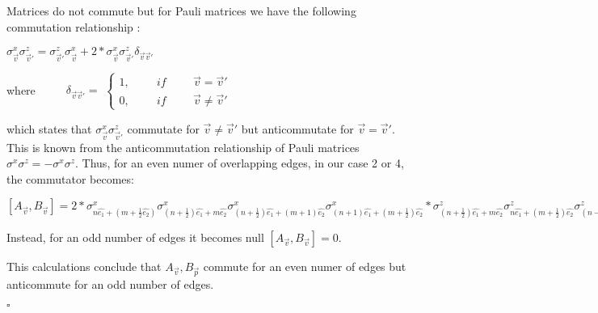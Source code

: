 \documentclass[12pt]{report}
\begin{document}
\begin{minipage}{1\textwidth}
		
		Matrices do not commute but for Pauli matrices we have the following commutation relationship :\newline
		
		
		\begin{center}
			$\sigma^x_{\vec{v}}\sigma^z_{\vec{v}'} = \sigma^z_{\vec{v}'} \sigma^x_{\vec{v}} + 2* \sigma^x_{\vec{v}}\sigma^z_{\vec{v}'} \delta_{\vec{v} \vec{v}'}$\newline
		\end{center}
		
		
		where $\hspace{1cm} \delta_{\vec{v} \vec{v}'} =$
		$\begin{cases}
			1, \hspace{1cm} if \hspace{1cm}  \vec{v} = \vec{v}'\\
			0, \hspace{1cm} if \hspace{1cm} \vec{v} \neq \vec{v}'
		\end{cases}$\newline
		
		which states that 	$\sigma^x_{\vec{v}}\sigma^z_{\vec{v}'}$ commutate for $\vec{v} \neq \vec{v}'$   but anticommutate for $\vec{v} = \vec{v}'$. This is known from the anticommutation relationship of Pauli matrices $\sigma^x \sigma^z = - \sigma^x \sigma^z$. Thus, for an even numer of overlapping edges, in our case 2 or 4, the commutator becomes:\newline
		
		\begin{center}
			
			$[A_{\vec{v}},B_{\vec{v}}] = 2 *
			\sigma^x_{n\hat{e_1} + (m+\frac{1}{2}\hat{e_2})} \sigma^x_{(n+ \frac{1}{2})\hat{e_1} + m\hat{e_2}} \sigma^x_{(n+ \frac{1}{2})\hat{e_1} + (m + 1)\hat{e_2}} \sigma^x_{(n+ 1)\hat{e_1} + (m + \frac{1}{2})\hat{e_2}}*
			\sigma^z_{(n+\frac{1}{2})\hat{e_1} + m\hat{e_2}} \sigma^z_{n\hat{e_1}+(m+\frac{1}{2})\hat{e_2}} \sigma^z_{(n-\frac{1}{2})\hat{e_1} + m\hat{e_2}} \sigma^z_{n\hat{e_1}+(m-\frac{1}{2})\hat{e_2}} $ 	\newline 
			
			
		\end{center}
		Instead, for an odd number of edges it becomes null $[A_{\vec{v}},B_{\vec{v}}]=0$.\newline
		
		This calculations conclude that $A_{\vec{v}},B_{\vec{p}}$ commute for an even numer of edges but anticommute for an odd number of edges.\newline
		
		\hfill $\square$\newline
		
		
	\end{minipage}
	
\end{document}
